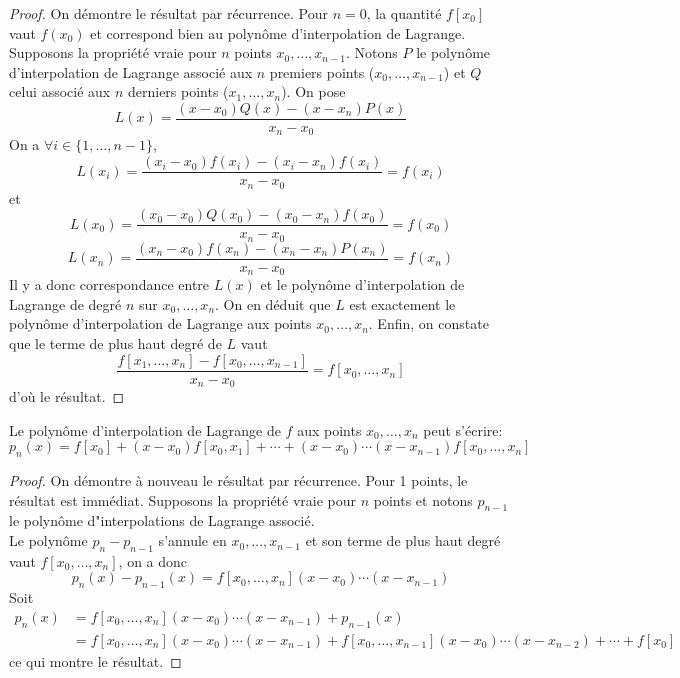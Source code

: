 \begin{proof}
On démontre le résultat par récurrence. Pour $n = 0$, la 
quantité $f[x_0]$ vaut $f(x_0)$ et correspond bien au 
polynôme d'interpolation de Lagrange. Supposons la propriété 
vraie pour $n$ points $x_0, \dots, x_{n-1}$. Notons $P$ le 
polynôme d'interpolation de Lagrange associé aux $n$ premiers 
points ($x_0, \dots, x_{n-1}$) et $Q$ celui associé aux 
$n$ derniers points ($x_1, \dots, x_{n}$). On pose
\[
L(x) = \frac{(x-x_0)Q(x) - (x-x_n)P(x)}{x_n - x_0}
\]
On a $\forall i \in \{1, \dots,n-1\}$, 
\[
L(x_i) = 
\frac{(x_i-x_0)f(x_i) - (x_i-x_n)f(x_i)}{x_n - x_0} = f(x_i)
\]
et
\[
L(x_0) = 
\frac{(x_0-x_0)Q(x_0) - (x_0-x_n)f(x_0)}{x_n - x_0} = f(x_0)
\]
\[
L(x_n) = 
\frac{(x_n-x_0)f(x_n) - (x_n-x_n)P(x_n)}{x_n - x_0} = f(x_n)
\]
Il y a donc correspondance entre $L(x)$ et le polynôme 
d'interpolation de Lagrange de degré $n$ sur $x_0, \dots, x_{n}$. On en déduit que $L$ est exactement le polynôme 
d'interpolation de Lagrange aux points $x_0, \dots, x_{n}$. 
Enfin, on constate que le terme de plus haut degré de $L$ vaut 
\[
\frac{f[x_1, \dots, x_n] - f[x_0, \dots, x_{n-1}]}{x_n - x_0}= f[x_0, \dots, x_n] 
\]
d'où le résultat.
\end{proof}


\begin{proposition}
\label{prop:interpolNewton}
Le polynôme d'interpolation de Lagrange de $f$ aux points 
$x_0, \dots, x_{n}$ peut s'écrire:
\[
p_n(x) = f[x_0] + (x-x_0)f[x_0, x_1] + \cdots + 
(x-x_0) \cdots (x-x_{n-1}) f[x_0, \dots, x_n]
\]
\end{proposition}

\begin{proof}
On démontre à nouveau le résultat par récurrence. Pour 1 points, 
le résultat est immédiat. Supposons la propriété vraie pour 
$n$ points et notons $p_{n-1}$ le polynôme d"interpolations 
de Lagrange associé. \\
Le polynôme $p_n - p_{n-1}$ s'annule en $x_0, \dots, x_{n-1}$ et 
son terme de plus haut degré vaut $f[x_0, \dots, x_n]$, on a 
donc 
\[
p_n(x) - p_{n-1}(x) = f[x_0, \dots, x_n](x-x_0) \cdots (x-x_{n-1})
\]
Soit
\begin{align*}
p_n(x) &= f[x_0, \dots, x_n](x-x_0) \cdots (x-x_{n-1}) +  p_{n-1}(x) \\
 &= f[x_0, \dots, x_n](x-x_0) \cdots (x-x_{n-1}) + 
f[x_0, \dots, x_{n-1}](x-x_0) \cdots (x-x_{n-2}) + \cdots 
+ f[x_0]
\end{align*}
ce qui montre le résultat.
\end{proof}

